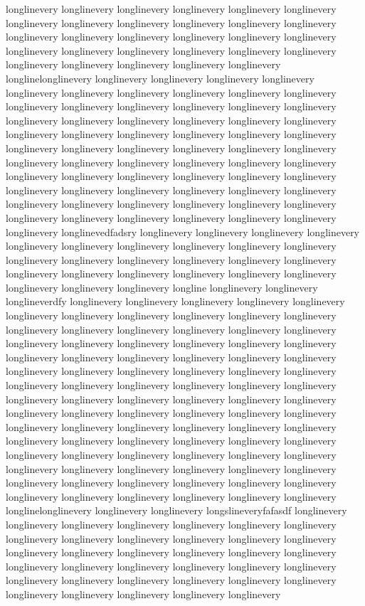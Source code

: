 {longlinevery longlinevery longlinevery longlinevery longlinevery longlinevery longlinevery longlinevery longlinevery longlinevery longlinevery longlinevery longlinevery longlinevery longlinevery longlinevery longlinevery longlinevery longlinevery longlinevery longlinevery longlinevery longlinevery longlinevery longlinevery longlinevery longlinevery longlinevery longlinevery longlinelonglinevery longlinevery longlinevery longlinevery longlinevery longlinevery longlinevery longlinevery longlinevery longlinevery longlinevery longlinevery longlinevery longlinevery longlinevery longlinevery longlinevery longlinevery longlinevery longlinevery longlinevery longlinevery longlinevery longlinevery longlinevery longlinevery longlinevery longlinevery longlinevery longlinevery longlinevery longlinevery longlinevery longlinevery longlinevery longlinevery longlinevery longlinevery longlinevery longlinevery longlinevery longlinevery longlinevery longlinevery longlinevery longlinevery longlinevery longlinevery longlinevery longlinevery longlinevery longlinevery longlinevery longlinevery longlinevery longlinevery longlinevery longlinevery longlinevery longlinevery longlinevery longlinevery longlinevery longlinevery longlinevery longlinevery longlinevedfadsry longlinevery longlinevery longlinevery longlinevery longlinevery longlinevery longlinevery longlinevery longlinevery longlinevery longlinevery longlinevery longlinevery longlinevery longlinevery longlinevery longlinevery longlinevery longlinevery longlinevery longlinevery longlinevery longlinevery longlinevery longlinevery longline longlinevery longlinevery longlineverdfy longlinevery longlinevery longlinevery longlinevery longlinevery longlinevery longlinevery longlinevery longlinevery longlinevery longlinevery longlinevery longlinevery longlinevery longlinevery longlinevery longlinevery longlinevery longlinevery longlinevery longlinevery longlinevery longlinevery longlinevery longlinevery longlinevery longlinevery longlinevery longlinevery longlinevery longlinevery longlinevery longlinevery longlinevery longlinevery longlinevery longlinevery longlinevery longlinevery longlinevery longlinevery longlinevery longlinevery longlinevery longlinevery longlinevery longlinevery longlinevery longlinevery longlinevery longlinevery longlinevery longlinevery longlinevery longlinevery longlinevery longlinevery longlinevery longlinevery longlinevery longlinevery longlinevery longlinevery longlinevery longlinevery longlinevery longlinevery longlinevery longlinevery longlinevery longlinevery longlinevery longlinevery longlinevery longlinevery longlinevery longlinevery longlinevery longlinevery longlinevery longlinevery longlinevery longlinevery longlinevery longlinevery longlinevery longlinevery longlinevery longlinevery longlinelonglinevery longlinevery longlinevery longslineveryfafasdf longlinevery longlinevery longlinevery longlinevery longlinevery longlinevery longlinevery longlinevery longlinevery longlinevery longlinevery longlinevery longlinevery longlinevery longlinevery longlinevery longlinevery longlinevery longlinevery longlinevery longlinevery longlinevery longlinevery longlinevery longlinevery longlinevery longlinevery longlinevery longlinevery longlinevery longlinevery longlinevery longlinevery longlinevery longlinevery longlinevery }
